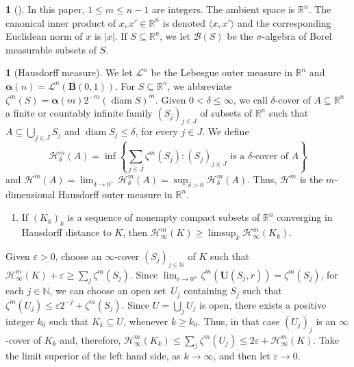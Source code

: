 \documentclass[11pt]{article}
\newcounter{cdrthm}[section]
\theoremstyle{definition}
\theoremstyle{jepanonymous}
\newtheorem{jepempty}[cdrthm]{}
\newenvironment{enonce}[2][remark]{\begin{jepempty}[#2]}{\end{jepempty}}
\theoremstyle{plain}
\newenvironment{Empty}[2][\null]{%
\begin{enonce}[remark]{#1}#2}
{\end{enonce}}
\newcommand{\N}{\mathbb{N}}
\newcommand{\R}{\mathbb{R}}
\newcommand{\Rn}{\R^n}
\newcommand{\calB}{\mathscr{B}}
\newcommand{\calH}{\mathscr{H}}
\newcommand{\calL}{\mathscr{L}}
\newcommand{\balpha}{\boldsymbol{\alpha}}
\newcommand{\bB}{{\boldsymbol{B}}}
\newcommand{\bU}{{\boldsymbol{U}}}
\DeclareMathOperator{\rmdiam}{\mathrm{diam}}
\let\veps\varepsilon
\let\la\langle
\let\ra\rangle
\let\subset\subseteq
\begin{document}
\begin{Empty}[]
In this paper, $1 \leq m \leq n-1$ are integers.
The ambient space is $\Rn$.
The canonical inner product of $x,x' \in \Rn$ is denoted $\la x,x' \ra$ and the corresponding Euclidean norm of $x$ is $|x|$.
If $S \subset \Rn$, we let $\calB(S)$ be the $\sigma$-algebra of Borel measurable subsets of $S$.
\end{Empty}

\begin{Empty}[Hausdorff measure]
\label{h.m}
We let $\calL^n$ be the Lebesgue outer measure in $\Rn$ and $\balpha(n) = \calL^n(\bB(0,1))$.
For $S \subset \Rn$, we abbreviate $\zeta^m(S) = \balpha(m) 2^{-m}(\rmdiam S)^m$.
Given $0 < \delta \leq \infty$, we call $\delta$-cover of $A \subset \Rn$ a finite or countably infinite family $(S_j)_{j \in J}$ of subsets of $\Rn$ such that $A \subset \bigcup_{j \in J} S_j$ and $\rmdiam S_j \leq \delta$, for every $j \in J$.
We define
\begin{equation*}\textstyle
\calH^m_\delta(A) = \inf \left\{ \sum_{j \in J} \zeta^m(S_j): (S_j)_{j \in J} \text{ is a $\delta$-cover of $A$}\right\}
\end{equation*}
and $\calH^m(A) = \lim_{\delta \to 0^+} \calH^m_\delta(A) = \sup_{\delta > 0} \calH^m_\delta(A)$.
Thus, $\calH^m$ is the $m$-dimensional Hausdorff outer measure in $\Rn$.
\par
{\it
\begin{enumerate}
\item\label{enum:2.1} If $(K_k)_k$ is a sequence of nonempty compact subsets of $\Rn$ converging in Hausdorff distance to $K$, then $\calH^m_\infty(K) \geq \limsup_k \calH^m_\infty(K_k)$.
\end{enumerate}
}
\par
Given $\veps > 0$, choose an $\infty$-cover $(S_j)_{j \in \N}$ of $K$ such that $\calH^m_\infty(K) + \veps \geq \sum_j \zeta^m(S_j)$.
Since $\lim_{r \to 0^+} \zeta^m(\bU(S_j,r))=\zeta^m(S_j)$, for each $j \in \N$, we can choose an open set~$U_j$ containing $S_j$ such that $\zeta^m(U_j) \leq \veps 2^{-j} + \zeta^m(S_j)$.
Since $U = \bigcup_j U_j$ is open, there exists a positive integer $k_0$ such that $K_k \subset U$, whenever $k \geq k_0$.
Thus, in that case $(U_j)_j$ is an $\infty$-cover of $K_k$ and, therefore, $\calH^m_\infty(K_k) \leq \sum_j \zeta^m(U_j) \leq 2\veps + \calH^m_\infty(K)$.
Take the limit superior of the left hand side, as $k \to \infty$, and then let $\veps \to 0$.
\par
{\it
\begin{enumerate}

\end{enumerate}}
\end{Empty}
\end{document}
